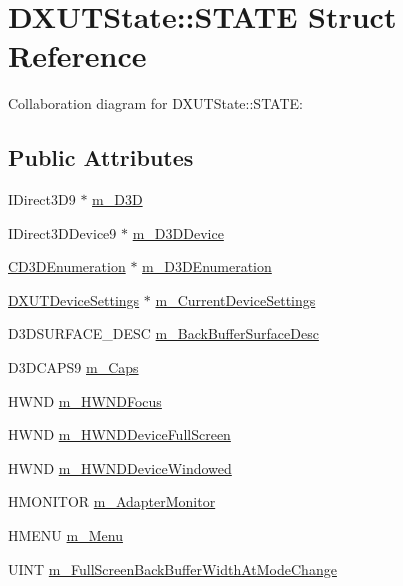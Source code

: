 \hypertarget{struct_d_x_u_t_state_1_1_s_t_a_t_e}{
\section{DXUTState::STATE Struct Reference}
\label{struct_d_x_u_t_state_1_1_s_t_a_t_e}
}
Collaboration diagram for DXUTState::STATE:\subsection*{Public Attributes}
\begin{DoxyCompactItemize}
\item 
IDirect3D9 $\ast$ \hyperlink{struct_d_x_u_t_state_1_1_s_t_a_t_e_a65d1a3f567ca32195cd31f5ff889c8cf}{m\_\-D3D}
\item 
IDirect3DDevice9 $\ast$ \hyperlink{struct_d_x_u_t_state_1_1_s_t_a_t_e_abbb0f67c4dff3fd3cf613ae6a2fec010}{m\_\-D3DDevice}
\item 
\hyperlink{class_c_d3_d_enumeration}{CD3DEnumeration} $\ast$ \hyperlink{struct_d_x_u_t_state_1_1_s_t_a_t_e_ae7f5993adc7dd726cb8d392ac9745adf}{m\_\-D3DEnumeration}
\item 
\hyperlink{struct_d_x_u_t_device_settings}{DXUTDeviceSettings} $\ast$ \hyperlink{struct_d_x_u_t_state_1_1_s_t_a_t_e_a7278461ac08aa316f1555203b616b1c5}{m\_\-CurrentDeviceSettings}
\item 
D3DSURFACE\_\-DESC \hyperlink{struct_d_x_u_t_state_1_1_s_t_a_t_e_aa932ec0f5b16e123a3a338e136b08026}{m\_\-BackBufferSurfaceDesc}
\item 
D3DCAPS9 \hyperlink{struct_d_x_u_t_state_1_1_s_t_a_t_e_a0dfb26596a75b24576af5fcad2f6bfd4}{m\_\-Caps}
\item 
HWND \hyperlink{struct_d_x_u_t_state_1_1_s_t_a_t_e_a582221b39599f423624f4f8460b77e18}{m\_\-HWNDFocus}
\item 
HWND \hyperlink{struct_d_x_u_t_state_1_1_s_t_a_t_e_a62c161bf3ed442d75890eff13050940e}{m\_\-HWNDDeviceFullScreen}
\item 
HWND \hyperlink{struct_d_x_u_t_state_1_1_s_t_a_t_e_a543f8fddc68bb0052eb4688964e8c8da}{m\_\-HWNDDeviceWindowed}
\item 
HMONITOR \hyperlink{struct_d_x_u_t_state_1_1_s_t_a_t_e_a71c6d350b032d377728ba18e5b90deed}{m\_\-AdapterMonitor}
\item 
HMENU \hyperlink{struct_d_x_u_t_state_1_1_s_t_a_t_e_a3bfc553b58cab27bee5d4f0c89ac4568}{m\_\-Menu}
\item 
UINT \hyperlink{struct_d_x_u_t_state_1_1_s_t_a_t_e_a5c05c68f55ddf278b7388237422738de}{m\_\-FullScreenBackBufferWidthAtModeChange}

\end{DoxyCompactItemize}
